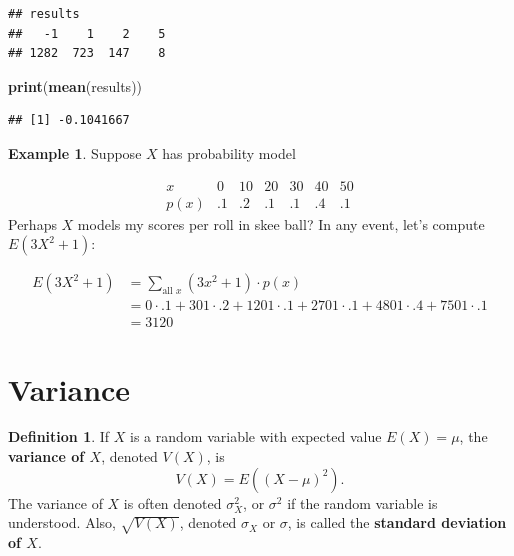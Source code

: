 \documentclass[
]{book}
\newenvironment{Shaded}{\begin{snugshade}}{\end{snugshade}}
\newcommand{\FunctionTok}[1]{\textcolor[rgb]{0.13,0.29,0.53}{\textbf{#1}}}
\newcommand{\NormalTok}[1]{#1}
\theoremstyle{definition}
\newtheorem{definition}{Definition}[chapter]
\theoremstyle{definition}
\newtheorem{example}{Example}[chapter]
\theoremstyle{definition}
\theoremstyle{definition}
\theoremstyle{remark}
\begin{document}
\begin{verbatim}
## results
##   -1    1    2    5 
## 1282  723  147    8
\end{verbatim}

\begin{Shaded}
\begin{Highlighting}[]
\FunctionTok{print}\NormalTok{(}\FunctionTok{mean}\NormalTok{(results))}
\end{Highlighting}
\end{Shaded}

\begin{verbatim}
## [1] -0.1041667
\end{verbatim}

\begin{example}
Suppose \(X\) has probability model

\[
\begin{array}{c|c|c|c|c|c|c}
x & 0 & 10 & 20 & 30 & 40 & 50\\ \hline
p(x) & .1 & .2 & .1 & .1 & .4 & .1  
\end{array}
\]
Perhaps \(X\) models my scores per roll in skee ball? In any event, let's compute \(E(3X^2 + 1)\):

\begin{align*}
E(3X^2 + 1) &= \sum_{\text{all }x} (3x^2 + 1)\cdot p(x)\\
&= 0 \cdot .1 + 301\cdot .2 + 1201\cdot .1 + 2701 \cdot .1 + 4801 \cdot .4 + 7501 \cdot .1\\
&= 3120
\end{align*}
\end{example}

\section{Variance}\label{variance}

\begin{definition}
\protect\hypertarget{def:variance-discrete}{}\label{def:variance-discrete}If \(X\) is a random variable with expected value \(E(X) = \mu\), the \textbf{variance of \(X\)}, denoted \(V(X)\), is \[V(X) = E((X-\mu)^2).\]
The variance of \(X\) is often denoted \(\sigma^2_X\), or \(\sigma^2\) if the random variable is understood. Also, \(\sqrt{V(X)}\), denoted \(\sigma_X\) or \(\sigma\), is called the \textbf{standard deviation of \(X\)}.
\end{definition}
\end{document}
